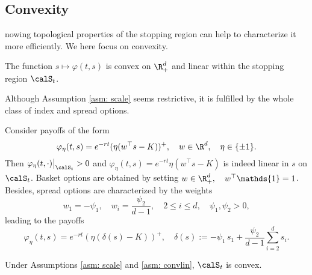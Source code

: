\subsection{Convexity}

nowing topological properties of the stopping region can help to characterize it more efficiently. We here focus on convexity.

\begin{asm}\label{asm: convlin}
The function $s \mapsto \varphi(t,s)$ is convex on $\R_+^d$ and linear within the stopping region $\calS_t$. 
\end{asm}

Although Assumption \ref{asm: scale} seems restrictive, it is fulfilled by the whole class of index and spread options.

\begin{example}
Consider payoffs of the form
$$\varphi_\eta(t,s) = e^{-rt}(\eta(w^\top s - K))^+, \quad w \in \R^d,  \quad \eta \in \{\pm 1\}.$$
Then $\varphi_\eta(t,\cdot)\big{|}_{\calS_t} >0$  and $\varphi_\eta(t,s) = e^{-rt}\eta(w^\top s - K)$ is indeed linear in $s$ on  $\calS_t $. Basket options  are obtained by setting  $w \in \R_+^d, \quad  w^\top \mathds{1}=1$. Besides, spread options are characterized by the weights $$w_1=-\psi_1 ,\quad  w_i= \frac{\psi_2}{d-1},  \quad 2 \leq i \leq d, \quad \psi_1,\psi_2>0,$$ leading to the payoffs
$$\varphi_\eta(t,s)= e^{-rt} (\eta (\delta(s)-K))^+,
\quad
\delta(s):=   - \psi_1\,s_1 +  \frac{\psi_2}{d-1}\sum_{i=2}^{d}s_i .$$
\end{example}


\begin{lemma}
Under Assumptions \ref{asm: scale} and \ref{asm: convlin},  $\calS_t$ is convex.
\end{lemma}

